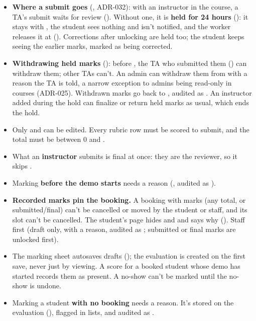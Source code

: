 \begin{itemize}
  \item \textbf{Where a submit goes} (, ADR-032): with an instructor in the course, a TA's submit waits for review (). Without one, it is \textbf{held for 24 hours} (): it stays  with , the student sees nothing and isn't notified, and the worker releases it at  (). Corrections after unlocking are held too; the student keeps seeing the earlier marks, marked as being corrected.
  \item \textbf{Withdrawing held marks} (): before , the TA who submitted them () can withdraw them; other TAs can't. An admin can withdraw them from  with a reason the TA is told, a narrow exception to admins being read-only in courses (ADR-025). Withdrawn marks go back to , audited as . An instructor added during the hold can finalize or return held marks as usual, which ends the hold.
  \item Only  and  can be edited. Every rubric row must be scored to submit, and the total must be between 0 and .
  \item What an \textbf{instructor} submits is final at once: they are the reviewer, so it skips .
  \item Marking \textbf{before the demo starts} needs a reason (, audited as ).
  \item \textbf{Recorded marks pin the booking.} A booking with marks (any total, or submitted/final) can't be cancelled or moved by the student or staff, and its slot can't be cancelled. The student's page hides  and  and says why (). Staff  first (draft only, with a reason, audited as ; submitted or final marks are unlocked first).
  \item The marking sheet autosaves drafts (); the evaluation is created on the first save, never just by viewing. A score for a booked student whose demo has started records them as present. A no-show can't be marked until the no-show is undone.
  \item Marking a student \textbf{with no booking} needs a reason. It's stored on the evaluation (), flagged in lists, and audited as .

\end{itemize}
